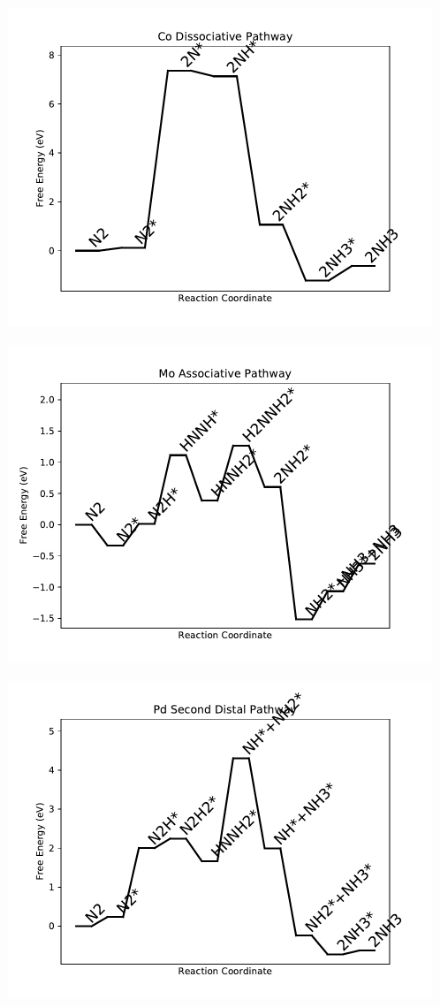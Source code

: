 \begin{figure}
\includegraphics[width=0.8\linewidth]{data/plots/Co_dissociative.pdf}
\label{fig:Co_dissociative}
\end{figure}

\begin{figure}
\includegraphics[width=0.8\linewidth]{data/plots/Mo_associative.pdf}
\label{fig:Mo_associative}
\end{figure}

\begin{figure}
\includegraphics[width=0.8\linewidth]{data/plots/Pd_distal_2.pdf}
\label{fig:Pd_distal_2}
\end{figure}

